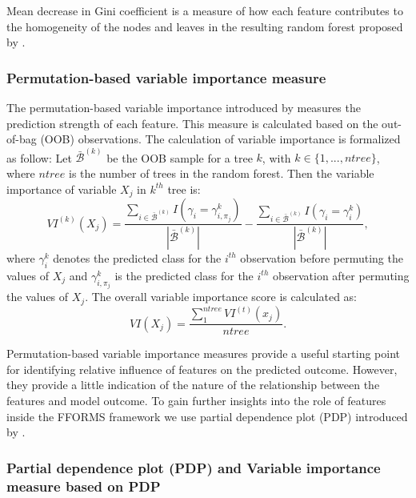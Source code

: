 \documentclass[11pt,a4paper,]{article}
\begin{document}
Mean decrease in Gini coefficient is a measure of how each feature
contributes to the homogeneity of the nodes and leaves in the resulting
random forest proposed by \textcite{breiman2001random}.

\subsubsection{Permutation-based variable importance
measure}\label{permutation-based-variable-importance-measure}

The permutation-based variable importance introduced by
\textcite{breiman2001random} measures the prediction strength of each
feature. This measure is calculated based on the out-of-bag (OOB)
observations. The calculation of variable importance is formalized as
follow: Let \(\bar{\mathcal{B}}^{(k)}\) be the OOB sample for a tree
\(k\), with \(k\in \{1,...,ntree\}\), where \(ntree\) is the number of
trees in the random forest. Then the variable importance of variable
\(X_{j}\) in \(k^{th}\) tree is:
\[VI^{(k)}(X_{j})=\frac{\sum_{i\in \bar{\mathcal{B}}^{(k)}}I(\gamma_{i}=\gamma_{i,\pi_{j}}^{k})}{|\bar{\mathcal{B}}^{(k)}|}-\frac{\sum_{i\in \bar{\mathcal{B}}^{(k)}}I(\gamma_{i}=\gamma_{i}^{k})}{|\bar{\mathcal{B}}^{(k)}|},\]
where \(\gamma_{i}^{k}\) denotes the predicted class for the \(i^{th}\)
observation before permuting the values of \(X_{j}\) and
\(\gamma_{i, \pi_{j}}^{k}\) is the predicted class for the \(i^{th}\)
observation after permuting the values of \(X_{j}\). The overall
variable importance score is calculated as:
\[VI(X_{j})=\frac{\sum_{1}^{ntree}VI^{(t)}(x_{j})}{ntree}.\]

Permutation-based variable importance measures provide a useful starting
point for identifying relative influence of features on the predicted
outcome. However, they provide a little indication of the nature of the
relationship between the features and model outcome. To gain further
insights into the role of features inside the FFORMS framework we use
partial dependence plot (PDP) introduced by
\textcite{friedman2008predictive}.

\subsubsection{Partial dependence plot (PDP) and Variable importance
measure based on
PDP}\label{partial-dependence-plot-pdp-and-variable-importance-measure-based-on-pdp}
\end{document}
